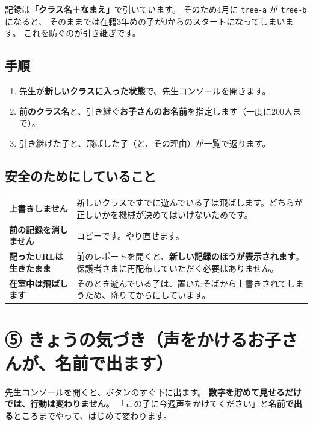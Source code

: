 \documentclass[a4paper,10.5pt]{article}
\newcommand{\hl}[1]{\textbf{\color{uspeakGreen}#1}}
\begin{document}
記録は\hl{「クラス名＋なまえ」}で引いています。
そのため4月に \texttt{tree-a} が \texttt{tree-b} になると、
そのままでは在籍3年めの子が0からのスタートになってしまいます。
これを防ぐのが引き継ぎです。

\subsection{手順}

\begin{enumerate}[leftmargin=1.4em,itemsep=2pt]
  \item 先生が\hl{新しいクラスに入った状態}で、先生コンソールを開きます。
  \item \hl{前のクラス名}と、引き継ぐ\hl{お子さんのお名前}を指定します（一度に200人まで）。
  \item 引き継げた子と、飛ばした子（と、その理由）が一覧で返ります。
\end{enumerate}

\subsection{安全のためにしていること}

\begin{center}
\begin{tabular}{@{}p{}p{}@{}}
\toprule
\hl{上書きしません} & 新しいクラスですでに遊んでいる子は飛ばします。どちらが正しいかを機械が決めてはいけないためです。\\
\hl{前の記録を消しません} & コピーです。やり直せます。\\
\hl{配ったURLは生きたまま} & 前のレポートを開くと、\textbf{新しい記録のほうが表示されます}。保護者さまに再配布していただく必要はありません。\\
\hl{在室中は飛ばします} & そのとき遊んでいる子は、置いたそばから上書きされてしまうため、降りてからにしています。\\
\bottomrule
\end{tabular}
\end{center}

\Needspace{118mm}
\section{⑤ きょうの気づき（声をかけるお子さんが、名前で出ます）}

先生コンソールを開くと、ボタンのすぐ下に出ます。
\hl{数字を貯めて見せるだけでは、行動は変わりません。}
「この子に今週声をかけてください」と\hl{名前で出る}ところまでやって、はじめて変わります。
\end{document}
